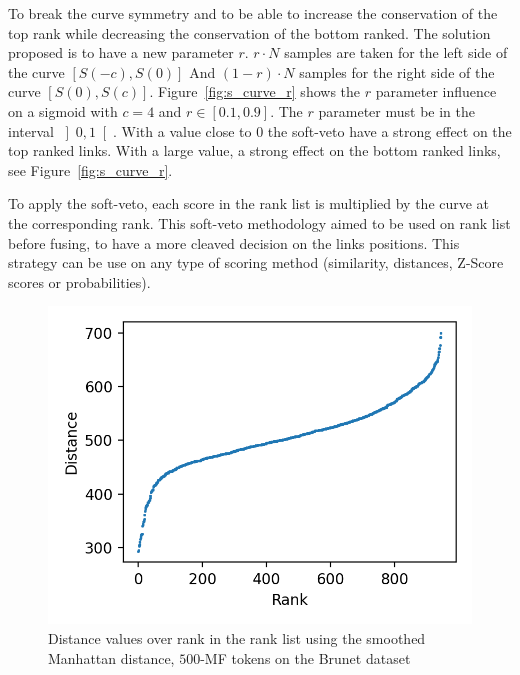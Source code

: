 To break the curve symmetry and to be able to increase the conservation of the top rank while decreasing the conservation of the bottom ranked.
The solution proposed is to have a new parameter $r$.
$r \cdot N$ samples are taken for the left side of the curve $\left[S(-c), S(0)\right]$
And $(1-r) \cdot N$ samples for the right side of the curve $\left[S(0), S(c)\right]$.
Figure~\ref{fig:s_curve_r} shows the $r$ parameter influence on a sigmoid with $c = 4$ and $r \in \left[0.1, 0.9\right]$.
The $r$ parameter must be in the interval $\left]0, 1\right[$.
With a value close to $0$ the soft-veto have a strong effect on the top ranked links.
With a large value, a strong effect on the bottom ranked links, see Figure~\ref{fig:s_curve_r}.

To apply the soft-veto, each score in the rank list is multiplied by the curve at the corresponding rank.
This soft-veto methodology aimed to be used on rank list before fusing, to have a more cleaved decision on the links positions.
This strategy can be use on any type of scoring method (similarity, distances, Z-Score scores or probabilities).

\begin{figure}
  \centering
  \caption{Distance values over rank in the rank list using the smoothed Manhattan distance, $500$-MF tokens on the Brunet dataset}
  \label{fig:distance_over_rank}
  \includegraphics[width=\linewidth]{img/distance_over_rank.png}
\end{figure}

